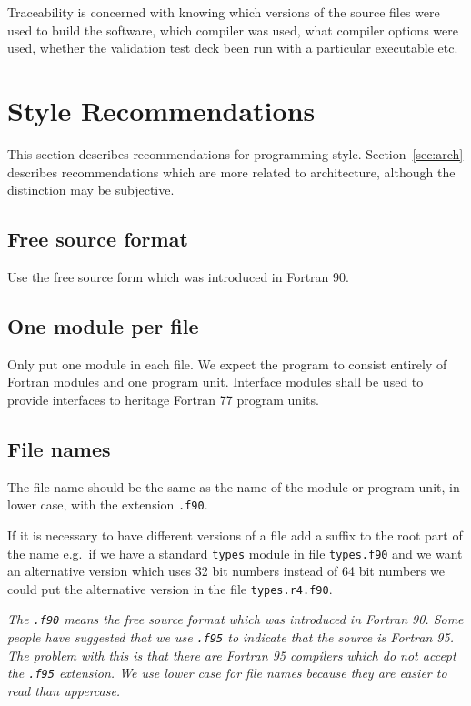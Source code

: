 \documentclass[11pt,twoside,a4paper]{report}
\begin{document}
Traceability is concerned with knowing which versions of the source 
files were used to build the software, which compiler was used,
what compiler options were used, whether the validation test deck been
run with a particular executable etc.

\chapter{Style Recommendations}
\label{sec:style}

This section describes recommendations for programming style.
Section~\ref{sec:arch} describes recommendations which are more
related to architecture, although the distinction may be subjective.

\section{Free source format}
Use the free source form which was introduced in Fortran 90.

\section{One module per file}
Only put one module in each file. We expect the program to consist
entirely of Fortran modules and one program unit. Interface modules
shall be used to provide interfaces to heritage Fortran 77 program units.

\section{File names}

The file name should be the same as the name of the module or 
program unit, in lower case, with the extension \verb|.f90|.

If it is necessary to have different versions of a file add a suffix
to the root part of the name e.g.\ if
we have a standard \verb|types| module in file \verb|types.f90| and
we want an alternative version which uses 32 bit numbers instead
of 64 bit  numbers we could put the alternative version in the
file \verb|types.r4.f90|.

{\it The \verb|.f90| means the free source format which was
  introduced in Fortran 90. Some people have suggested that we
   use  \verb|.f95| to indicate that the source is Fortran 95. The
   problem with this is that there are Fortran 
   95 compilers which do not accept the  \verb|.f95| extension.
   We use lower case for file names because they are easier 
   to read than uppercase.}
\end{document}
